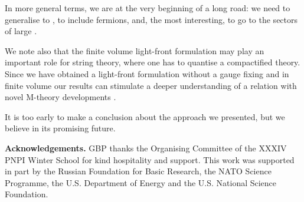\documentclass[a4paper,12pt]{article}
\begin{document}
In more general terms, we are at 
the very beginning of a long road: 
we need to generalise  to \coordHE{}, to include fermions, and, 
the most interesting, to go to the sectors of large \coordHE{}. 

We note also that the finite volume light-front formulation 
may play an important role for string theory,
where one has to quantise  a compactified theory.
Since we have obtained a light-front formulation 
without a gauge fixing 
and in finite volume our results can stimulate 
a deeper understanding 
of a relation with novel
M-theory developments \cite{Susskind}.

It is too early to make a conclusion about the 
approach we presented, but we believe in its 
promising future.



{\bf Acknowledgements.}
GBP thanks the Organising Committee of the XXXIV PNPI Winter School
for kind hospitality and support. 
This work was supported  in part
by the Russian Foundation 
for Basic Research,  the NATO Science Programme,
the U.S. Department of Energy and the U.S. National Science Foundation.
\end{document}
